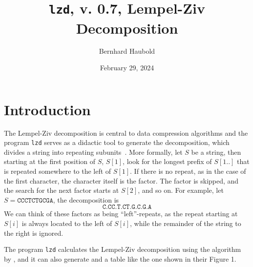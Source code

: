 \documentclass{article}
\newcommand{\ty}{\texttt}
\begin{document}
\title{\ty{lzd}, v. 0.7, Lempel-Ziv Decomposition}
\author{Bernhard Haubold}
\date{February 29, 2024}
\maketitle
\section{Introduction}
The Lempel-Ziv decomposition is central to data compression algorithms
and the program \ty{lzd} serves as a didactic tool to generate the
decomposition, which divides a string into repeating
subunits~\citep{ziv77:uni}. More formally, let $S$ be a string, then
starting at the first position of $S$, $S[1]$, look for the longest
prefix of $S[1..]$ that is repeated somewhere to the left of
$S[1]$. If there is no repeat, as in the case of the first character,
the character itself is the factor. The factor is skipped, and the
search for the next factor starts at $S[2]$, and so on. For example,
let $S=\ty{CCCTCTGCGA}$, the decomposition is
\[
\ty{C.CC.T.CT.G.C.G.A}
\]
We can think of these factors as being ``left''-repeats, as the repeat
starting at $S[i]$ is always located to the left of $S[i]$, while the
remainder of the string to the right is ignored.

The program \ty{lzd} calculates the Lempel-Ziv decomposition using the
algorithm by \citet{cro08:sim}, and it can also generate and a table
like the one shown in their Figure 1.
\end{document}
